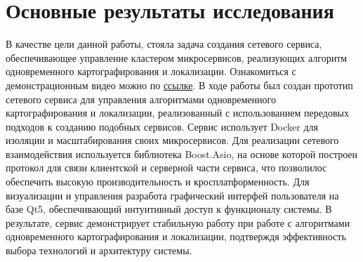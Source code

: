 \documentclass[a4paper, 14pt]{extreport}
\begin{document}
\section{Основные результаты исследования}
\par В качестве цели данной работы, стояла задача создания сетевого сервиса, обеспечивающее управление кластером 
микросервисов, реализующих алгоритм одновременного картографирования и локализации. Ознакомиться с демонстрационным 
видео можно по \href{https://rutube.ru/video/508c42fa971fc0d4260576602548bb51/}{ссылке}. В ходе работы был создан 
прототип сетевого сервиса для управления алгоритмами одновременного картографирования и локализации, реализованный 
с использованием передовых подходов к созданию подобных сервисов. Сервис использует Docker для изоляции и масштабирования 
своих микросервисов.  Для реализации сетевого взаимодействия используется библиотека Boost.Asio, на основе которой 
построен протокол для связи клиентской и серверной части сервиса, что позволилос обеспечить высокую производительность 
и кросплатформенность. Для визуализации и управления разработа графический интерфей пользователя на базе Qt5, 
обеспечивающий интуитивный доступ к функционалу системы. В результате, сервис демонстрирует стабильную работу при 
работе с алгоритмами одновременного картографирования и локализации, подтверждя эффективность выбора технологий и 
архитектуру системы.
\end{document}
